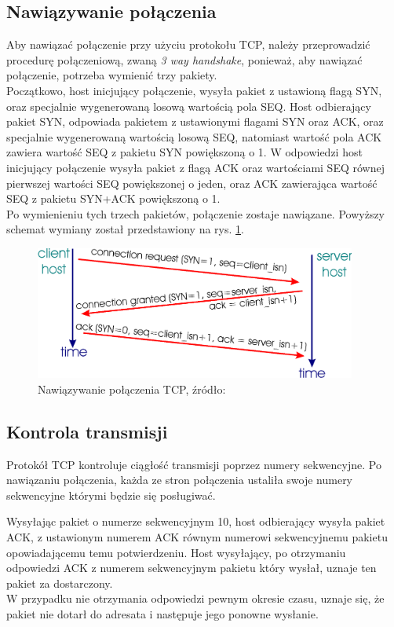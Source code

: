 		\subsection{Nawiązywanie połączenia}
			Aby nawiązać połączenie przy użyciu protokołu TCP, należy przeprowadzić procedurę połączeniową, zwaną \textit{3 way handshake}, ponieważ, aby nawiązać połączenie, potrzeba wymienić trzy pakiety.\\
			Początkowo, host inicjujący połączenie, wysyła pakiet z ustawioną flagą SYN, oraz specjalnie wygenerowaną losową wartością pola SEQ. Host odbierający pakiet SYN, odpowiada pakietem z ustawionymi flagami SYN oraz ACK, oraz specjalnie wygenerowaną wartością losową SEQ, natomiast wartość pola ACK zawiera wartość SEQ z pakietu SYN powiększoną o 1.
			W odpowiedzi host inicjujący połączenie wysyła pakiet z flagą ACK oraz wartościami SEQ równej pierwszej wartości SEQ powiększonej o jeden, oraz ACK zawierająca wartość SEQ z pakietu SYN+ACK powiększoną o 1.\\
			Po wymienieniu tych trzech pakietów, połączenie zostaje nawiązane.
			Powyższy schemat wymiany został przedstawiony na rys. \ref{fig:tcp_syn}.
			\begin{figure}[h]
				\centering
					\includegraphics[width=400px]{tcp_3way.png}
					\caption{Nawiązywanie połączenia TCP, źródło: \cite{3way}}
					\label{fig:tcp_syn}
			\end{figure}
		\subsection{Kontrola transmisji}
			Protokół TCP kontroluje ciągłość transmisji poprzez numery sekwencyjne.
			Po nawiązaniu połączenia, każda ze stron połączenia ustaliła swoje numery sekwencyjne którymi będzie się posługiwać.
			
			Wysyłając pakiet o numerze sekwencyjnym 10, host odbierający wysyła pakiet ACK, z ustawionym numerem ACK równym numerowi sekwencyjnemu pakietu opowiadającemu temu potwierdzeniu.
			Host wysyłający, po otrzymaniu odpowiedzi ACK z numerem sekwencyjnym pakietu który wysłał, uznaje ten pakiet za dostarczony.\\
			W przypadku nie otrzymania odpowiedzi pewnym okresie czasu, uznaje się, że pakiet nie dotarł do adresata i następuje jego ponowne wysłanie.

